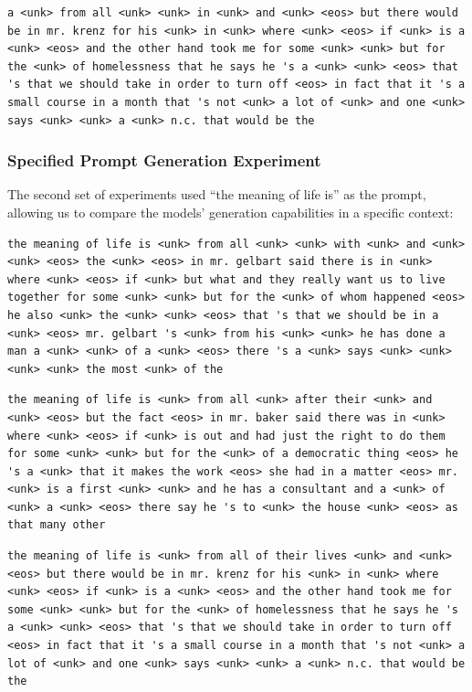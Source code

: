 \documentclass[12pt,oneside]{article}
\begin{document}
\begin{lstlisting}[caption=RNN Model Generation]
a <unk> from all <unk> <unk> in <unk> and <unk> <eos> but there would be in mr. krenz for his <unk> in <unk> where <unk> <eos> if <unk> is a <unk> <eos> and the other hand took me for some <unk> <unk> but for the <unk> of homelessness that he says he 's a <unk> <unk> <eos> that 's that we should take in order to turn off <eos> in fact that it 's a small course in a month that 's not <unk> a lot of <unk> and one <unk> says <unk> <unk> a <unk> n.c. that would be the
\end{lstlisting}

\subsubsection{Specified Prompt Generation Experiment}

The second set of experiments used ``the meaning of life is'' as the prompt, allowing us to compare the models' generation capabilities in a specific context:

\begin{lstlisting}[caption=Transformer Model Generation]
the meaning of life is <unk> from all <unk> <unk> with <unk> and <unk> <unk> <eos> the <unk> <eos> in mr. gelbart said there is in <unk> where <unk> <eos> if <unk> but what and they really want us to live together for some <unk> <unk> but for the <unk> of whom happened <eos> he also <unk> the <unk> <unk> <eos> that 's that we should be in a <unk> <eos> mr. gelbart 's <unk> from his <unk> <unk> he has done a man a <unk> <unk> of a <unk> <eos> there 's a <unk> says <unk> <unk> <unk> <unk> the most <unk> of the
\end{lstlisting}

\begin{lstlisting}[caption=LSTM Model Generation]
the meaning of life is <unk> from all <unk> after their <unk> and <unk> <eos> but the fact <eos> in mr. baker said there was in <unk> where <unk> <eos> if <unk> is out and had just the right to do them for some <unk> <unk> but for the <unk> of a democratic thing <eos> he 's a <unk> that it makes the work <eos> she had in a matter <eos> mr. <unk> is a first <unk> <unk> and he has a consultant and a <unk> of <unk> a <unk> <eos> there say he 's to <unk> the house <unk> <eos> as that many other
\end{lstlisting}

\begin{lstlisting}[caption=RNN Model Generation]
the meaning of life is <unk> from all of their lives <unk> and <unk> <eos> but there would be in mr. krenz for his <unk> in <unk> where <unk> <eos> if <unk> is a <unk> <eos> and the other hand took me for some <unk> <unk> but for the <unk> of homelessness that he says he 's a <unk> <unk> <eos> that 's that we should take in order to turn off <eos> in fact that it 's a small course in a month that 's not <unk> a lot of <unk> and one <unk> says <unk> <unk> a <unk> n.c. that would be the
\end{lstlisting}
\end{document}
